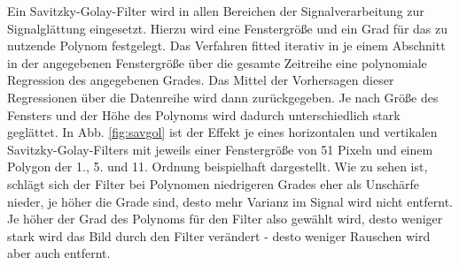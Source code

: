 \documentclass[
  12pt,
  openany]{book}
\begin{document}
Ein Savitzky-Golay-Filter wird in allen Bereichen der Signalverarbeitung zur Signalglättung eingesetzt. Hierzu wird eine Fenstergröße und ein Grad für das zu nutzende Polynom festgelegt. Das Verfahren fitted iterativ in je einem Abschnitt in der angegebenen Fenstergröße über die gesamte Zeitreihe eine polynomiale Regression des angegebenen Grades. Das Mittel der Vorhersagen dieser Regressionen über die Datenreihe wird dann zurückgegeben. Je nach Größe des Fensters und der Höhe des Polynoms wird dadurch unterschiedlich stark geglättet. \newline
In Abb. \ref{fig:savgol} ist der Effekt je eines horizontalen und vertikalen Savitzky-Golay-Filters mit jeweils einer Fenstergröße von 51 Pixeln und einem Polygon der 1., 5. und 11. Ordnung beispielhaft dargestellt. Wie zu sehen ist, schlägt sich der Filter bei Polynomen niedrigeren Grades eher als Unschärfe nieder, je höher die Grade sind, desto mehr Varianz im Signal wird nicht entfernt. Je höher der Grad des Polynoms für den Filter also gewählt wird, desto weniger stark wird das Bild durch den Filter verändert - desto weniger Rauschen wird aber auch entfernt.
\end{document}
